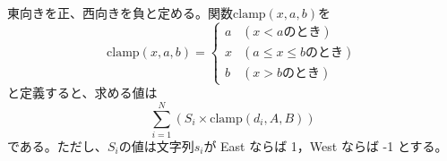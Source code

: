 \documentclass{article}
\begin{document}
東向きを正、西向きを負と定める。関数$\mathrm{clamp}(x, a, b)$を
\begin{equation}
    \mathrm{clamp}(x, a, b) =
    \begin{cases}
        a & (x < a \mbox{のとき}) \\
        x & (a \leq x \leq b \mbox{のとき}) \\
        b & (x > b \mbox{のとき})
    \end{cases}
\end{equation}
と定義すると、求める値は
\begin{equation}
    \sum_{i = 1}^{N} \left( S_i \times \mathrm{clamp}(d_i, A, B) \right)
\end{equation}
である。ただし、$S_i$の値は文字列$s_i$が East ならば 1，West ならば -1 とする。
\end{document}
